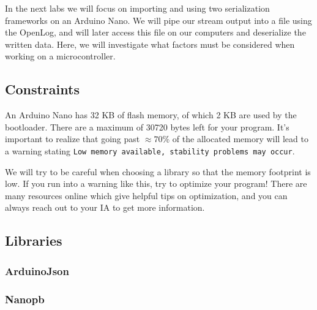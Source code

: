 In the next labs we will focus on importing and using two serialization frameworks on an Arduino Nano. We will pipe our stream output into a file using the OpenLog, and will later access this file on our computers and deserialize the written data. Here, we will investigate what factors must be considered when working on a microcontroller. 

\subsection{Constraints}
An Arduino Nano has 32 KB of flash memory, of which 2 KB are used by the bootloader. There are a maximum of 30720 bytes left for your program.  It's important to realize that going past $\approx 70$\% of the allocated memory will lead to a warning stating \texttt{Low memory available, stability problems may occur}. 

We will try to be careful when choosing a library so that the memory footprint is low. If you run into a warning like this, try to optimize your program! There are many resources online which give helpful tips on optimization, and you can always reach out to your IA to get more information. 

\subsection{Libraries}
\subsubsection{ArduinoJson}
\subsubsection{Nanopb}


